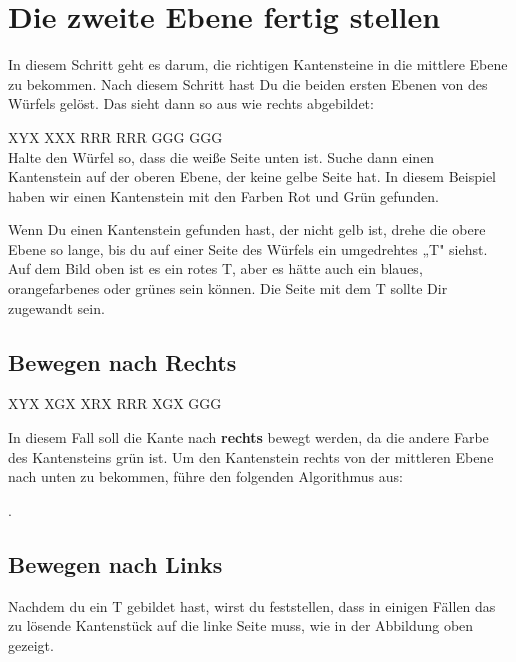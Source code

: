 \section{Die zweite Ebene fertig stellen}
\parbox{0.7\linewidth}{
In diesem Schritt geht es darum, die richtigen Kantensteine in die mittlere Ebene zu bekommen.
Nach diesem Schritt hast Du die beiden ersten Ebenen von des Würfels gelöst.
Das sieht dann so aus wie rechts abgebildet:
}
\RubikCubeGreyAll%
            {X}{Y}{X}
            {X}{X}{X}%
               {R}{R}{R}
	       {R}{R}{R}%
	       {G}{G}{G}
	       {G}{G}{G}%
\\[1em]

Halte den Würfel so, dass die weiße Seite unten ist.
Suche dann einen Kantenstein auf der oberen Ebene, der keine gelbe Seite hat.
In diesem Beispiel haben wir einen Kantenstein mit den Farben Rot und Grün gefunden.

Wenn Du einen Kantenstein gefunden hast, der nicht gelb ist, drehe die obere Ebene so lange, bis du auf einer Seite des Würfels ein umgedrehtes „T" siehst.
Auf dem Bild oben ist es ein rotes T, aber es hätte auch ein blaues, orangefarbenes oder grünes sein können. 
Die Seite mit dem T sollte Dir zugewandt sein.

\subsection{Bewegen nach Rechts}
\RubikCubeGreyAll%
            {X}{Y}{X}
            {X}{G}{X}%
               {X}{R}{X}
	       {R}{R}{R}%
	       {X}{G}{X}
	       {G}{G}{G}%
\parbox{0.7\linewidth}{
  In diesem Fall soll die Kante nach \textbf{rechts} bewegt werden, da die andere
  Farbe des Kantensteins grün ist. Um den Kantenstein rechts von der mittleren
  Ebene nach unten zu bekommen, führe den folgenden Algorithmus aus:
}
\begin{center}
.
\end{center}


\subsection{Bewegen nach Links}
Nachdem du ein T gebildet hast, wirst du feststellen, dass in einigen Fällen
das zu lösende Kantenstück auf die linke Seite muss, wie in der Abbildung oben
gezeigt.\\[1em]

